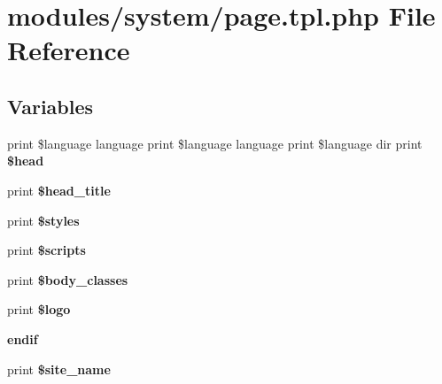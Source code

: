 \hypertarget{modules_2system_2page_8tpl_8php}{
\section{modules/system/page.tpl.php File Reference}
\label{modules_2system_2page_8tpl_8php}
}
\subsection*{Variables}
\begin{CompactItemize}
\item 
\hypertarget{modules_2system_2page_8tpl_8php_a39baa067b61ab1dab26b85467109804}{
print \$language language print \$language language print \$language dir print \textbf{\$head}}
\label{modules_2system_2page_8tpl_8php_a39baa067b61ab1dab26b85467109804}

\item 
\hypertarget{modules_2system_2page_8tpl_8php_107cec09f27fd63715a39ba222571e1e}{
print \textbf{\$head\_\-title}}
\label{modules_2system_2page_8tpl_8php_107cec09f27fd63715a39ba222571e1e}

\item 
\hypertarget{modules_2system_2page_8tpl_8php_8f1db0526d0e6b99ae580d83209e717f}{
print \textbf{\$styles}}
\label{modules_2system_2page_8tpl_8php_8f1db0526d0e6b99ae580d83209e717f}

\item 
\hypertarget{modules_2system_2page_8tpl_8php_2163fdf9fe7af884a6291084c2811896}{
print \textbf{\$scripts}}
\label{modules_2system_2page_8tpl_8php_2163fdf9fe7af884a6291084c2811896}

\item 
\hypertarget{modules_2system_2page_8tpl_8php_2f8fed7975bdbd67afbc008ef7b0c2ca}{
print \textbf{\$body\_\-classes}}
\label{modules_2system_2page_8tpl_8php_2f8fed7975bdbd67afbc008ef7b0c2ca}

\item 
\hypertarget{modules_2system_2page_8tpl_8php_0fa695c12e5240657bb07a7742cf8391}{
print \textbf{\$logo}}
\label{modules_2system_2page_8tpl_8php_0fa695c12e5240657bb07a7742cf8391}

\item 
\hypertarget{modules_2system_2page_8tpl_8php_9ecbffef21ad2507edfcf60b871713c6}{
\textbf{endif}}
\label{modules_2system_2page_8tpl_8php_9ecbffef21ad2507edfcf60b871713c6}

\item 
\hypertarget{modules_2system_2page_8tpl_8php_d500e3900e86a2e78f15afbe44b1f849}{
print \textbf{\$site\_\-name}}
\label{modules_2system_2page_8tpl_8php_d500e3900e86a2e78f15afbe44b1f849}


\end{CompactItemize}
